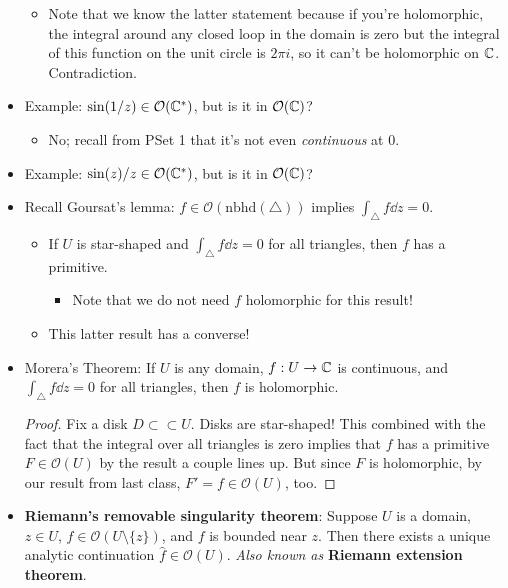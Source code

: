 \documentclass[../notes.tex]{subfiles}
\begin{document}
\begin{itemize}
    \begin{itemize}
        \item Note that we know the latter statement because if you're holomorphic, the integral around any closed loop in the domain is zero but the integral of this function on the unit circle is $2\pi i$, so it can't be holomorphic on $\mathbb{C}$. Contradiction.
    \end{itemize}
    \item Example: $\sin(1/z)\in\mathcal{O}(\mathbb{C}^*)$, but is it in $\mathcal{O}(\mathbb{C})$?
    \begin{itemize}
        \item No; recall from PSet 1 that it's not even \emph{continuous} at 0.
    \end{itemize}
    \item Example: $\sin(z)/z\in\mathcal{O}(\mathbb{C}^*)$, but is it in $\mathcal{O}(\mathbb{C})$?
    \item Recall Goursat's lemma: $f\in\mathcal{O}(\text{nbhd}(\triangle))$ implies $\int_\triangle f\dd{z}=0$.
    \begin{itemize}
        \item If $U$ is star-shaped and $\int_\triangle f\dd{z}=0$ for all triangles, then $f$ has a primitive.
        \begin{itemize}
            \item Note that we do not need $f$ holomorphic for this result!
        \end{itemize}
        \item This latter result has a converse!
    \end{itemize}
    \item Morera's Theorem: If $U$ is any domain, $f:U\to\mathbb{C}$ is continuous, and $\int_\triangle f\dd{z}=0$ for all triangles, then $f$ is holomorphic.
    \begin{proof}
        Fix a disk $D\subset\subset U$. Disks are star-shaped! This combined with the fact that the integral over all triangles is zero implies that $f$ has a primitive $F\in\mathcal{O}(U)$ by the result a couple lines up. But since $F$ is holomorphic, by our result from last class, $F'=f\in\mathcal{O}(U)$, too.
    \end{proof}
    \item \textbf{Riemann's removable singularity theorem}: Suppose $U$ is a domain, $z\in U$, $f\in\mathcal{O}(U\setminus\{z\})$, and $f$ is bounded near $z$. Then there exists a unique analytic continuation $\hat{f}\in\mathcal{O}(U)$. \emph{Also known as} \textbf{Riemann extension theorem}.

\end{itemize}
\end{document}
